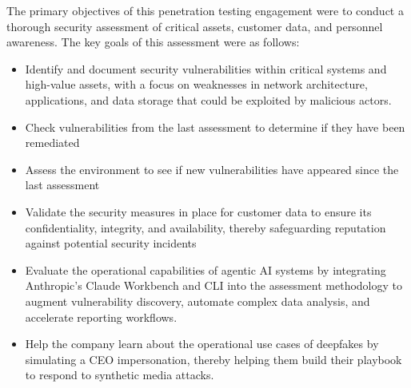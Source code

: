 The primary objectives of this penetration testing engagement were to conduct a thorough security assessment of \clientP critical assets, customer data, and personnel awareness. The key goals of this assessment were as follows:

\begin{itemize}
\item Identify and document security vulnerabilities within critical systems and high-value assets, with a focus on weaknesses in network architecture, applications, and data storage that could be exploited by malicious actors.\item Check vulnerabilities from the last assessment to determine if they have been remediated\item Assess the environment to see if new vulnerabilities have appeared since the last assessment\item Validate the security measures in place for customer data to ensure its confidentiality, integrity, and availability, thereby safeguarding \clientP reputation against potential security incidents\item Evaluate the operational capabilities of agentic AI systems by integrating Anthropic's Claude Workbench and CLI into the assessment methodology to augment vulnerability discovery, automate complex data analysis, and accelerate reporting workflows.\item Help the company learn about the operational use cases of deepfakes by simulating a CEO impersonation, thereby helping them build their playbook to respond to synthetic media attacks.
\end{itemize}
